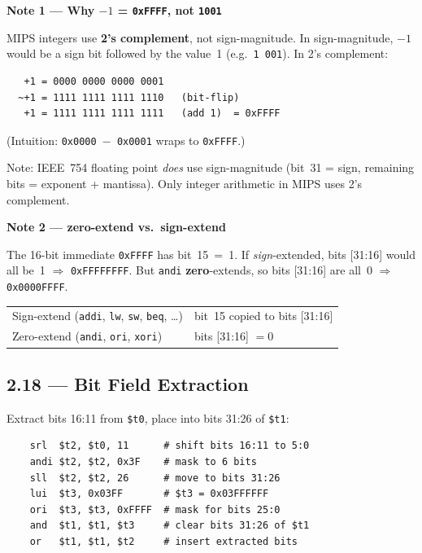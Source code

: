 \begin{flushright}
\begin{minipage}{0.92\linewidth}
\scriptsize
\textbf{Note 1 --- Why $-1$ = \texttt{0xFFFF}, not \texttt{1001}}\par\smallskip
MIPS integers use \textbf{2's complement}, not sign-magnitude.
In sign-magnitude, $-1$ would be a sign bit followed by the value~1
(e.g.\ \texttt{1\,001}).
In 2's complement:
\begin{verbatim}
   +1 = 0000 0000 0000 0001
  ~+1 = 1111 1111 1111 1110   (bit-flip)
   +1 = 1111 1111 1111 1111   (add 1)  = 0xFFFF
\end{verbatim}
\vspace{-6pt}
(Intuition: \texttt{0x0000 $-$ 0x0001} wraps to \texttt{0xFFFF}.)

\smallskip
Note: IEEE~754 floating point \emph{does} use sign-magnitude
(bit~31 = sign, remaining bits = exponent + mantissa).
Only integer arithmetic in MIPS uses 2's complement.

\medskip
\textbf{Note 2 --- zero-extend vs.\ sign-extend}\par\smallskip
The 16-bit immediate \texttt{0xFFFF} has bit~15~=~1.
If \emph{sign}-extended, bits [31:16] would all be~1
$\Rightarrow$ \texttt{0xFFFFFFFF}.
But \texttt{andi} \textbf{zero}-extends, so bits [31:16] are all~0
$\Rightarrow$ \texttt{0x0000FFFF}.

\smallskip
\begin{tabular}{@{}l l@{}}
\toprule
Sign-extend (\texttt{addi}, \texttt{lw}, \texttt{sw}, \texttt{beq}, \ldots)
  & bit~15 copied to bits [31:16] \\
Zero-extend (\texttt{andi}, \texttt{ori}, \texttt{xori})
  & bits [31:16] $= 0$ \\
\bottomrule
\end{tabular}
\end{minipage}
\end{flushright}

\subsection*{2.18 --- Bit Field Extraction}
\hypertarget{sol-2.18}{}

Extract bits 16:11 from \texttt{\$t0}, place into bits 31:26 of
\texttt{\$t1}:
\begin{verbatim}
    srl  $t2, $t0, 11      # shift bits 16:11 to 5:0
    andi $t2, $t2, 0x3F    # mask to 6 bits
    sll  $t2, $t2, 26      # move to bits 31:26
    lui  $t3, 0x03FF       # $t3 = 0x03FFFFFF
    ori  $t3, $t3, 0xFFFF  # mask for bits 25:0
    and  $t1, $t1, $t3     # clear bits 31:26 of $t1
    or   $t1, $t1, $t2     # insert extracted bits
\end{verbatim}

